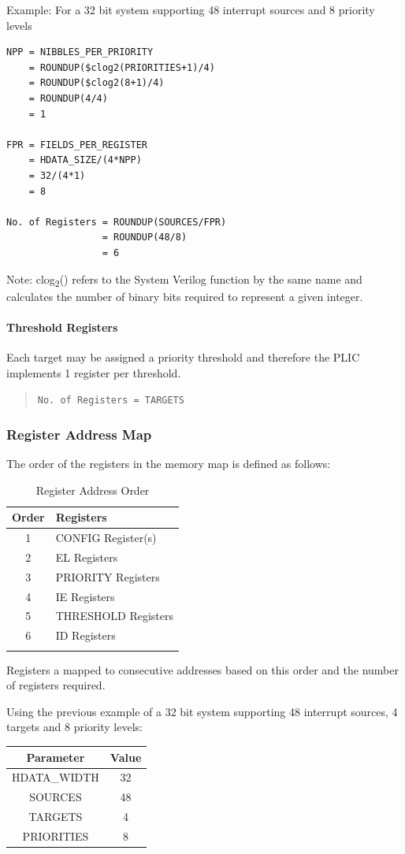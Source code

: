Example: For a 32 bit system supporting 48 interrupt sources and 8
priority levels

\begin{verbatim}
NPP = NIBBLES_PER_PRIORITY
    = ROUNDUP($clog2(PRIORITIES+1)/4)
    = ROUNDUP($clog2(8+1)/4)
    = ROUNDUP(4/4)
    = 1

FPR = FIELDS_PER_REGISTER
    = HDATA_SIZE/(4*NPP)
    = 32/(4*1)
    = 8

No. of Registers = ROUNDUP(SOURCES/FPR)
                 = ROUNDUP(48/8)
                 = 6
\end{verbatim}

Note: clog\textsubscript{2}() refers to the System Verilog function by
the same name and calculates the number of binary bits required to
represent a given integer.

\paragraph{Threshold Registers}

Each target may be assigned a priority threshold and therefore the PLIC
implements 1 register per threshold.

\begin{quote}
\texttt{No.\ of\ Registers\ =\ TARGETS}
\end{quote}

\subsubsection{Register Address Map}

The order of the registers in the memory map is defined as follows:

\begin{longtable}[]{@{}cl@{}}
\toprule
\textbf{Order} & \textbf{Registers}\tabularnewline
\midrule
\endhead
1 & CONFIG Register(s)\tabularnewline
2 & EL Registers\tabularnewline
3 & PRIORITY Registers\tabularnewline
4 & IE Registers\tabularnewline
5 & THRESHOLD Registers\tabularnewline
6 & ID Registers\tabularnewline
\bottomrule
\caption{Register Address Order}
\label{tab:REGMAP}
\end{longtable}

Registers a mapped to consecutive addresses based on this order and the
number of registers required.

Using the previous example of a 32 bit system supporting 48 interrupt
sources, 4 targets and 8 priority levels:

\begin{longtable}[]{@{}cc@{}}
\toprule
\textbf{Parameter} & \textbf{Value}\tabularnewline
\midrule
\endhead
HDATA\_WIDTH & 32\tabularnewline
SOURCES & 48\tabularnewline
TARGETS & 4\tabularnewline
PRIORITIES & 8\tabularnewline
\bottomrule
\end{longtable}

